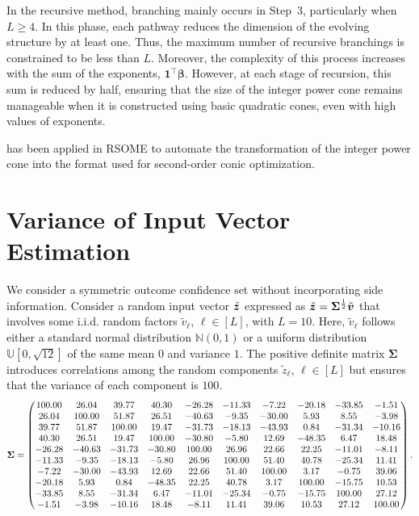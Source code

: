 \documentclass[mnsc, nonblindrev]{informswp}
\newcommand{\1}[1]{\mathds{1}{\left(#1\right)}}
\begin{document}
\begin{appendices}
In the recursive method, branching mainly occurs in Step~$3$, particularly when $L \geq 4$. In this phase, each pathway reduces the dimension of the evolving structure by at least one. Thus, the maximum number of recursive branchings is constrained to be less than \(L\). Moreover, the complexity of this process increases with the sum of the exponents, \(\bm{1}^\top \bm{\beta}\). However, at each stage of recursion, this sum is reduced by half, ensuring that the size of the integer power cone remains manageable when it is constructed using basic quadratic cones, even with high values of exponents.

 has been applied in RSOME to automate the transformation of the integer power cone into the format used for second-order conic optimization.

\section{Variance of Input Vector Estimation}
\label{sec:sensitive_input}
We consider a symmetric outcome confidence set without incorporating side information. Consider a random input vector $\tilde{\bm{z}}$ expressed as $\tilde{\bm{z}} = {\mathbf{\Sigma}}^{\frac{1}{2}} \tilde{\bm{v}}$ that involves some i.i.d. random factors $\tilde v_\ell$, $\ell \in [L]$, with $L = 10$. Here, $\tilde v_\ell$ follows either a standard normal distribution $\mathbb{N}(0,1)$ or a uniform distribution $\mathbb{U}[0,\sqrt{12}]$ of the same mean $0$ and variance $1$. The positive definite matrix $\bm \Sigma$ introduces correlations among the random components $\tilde z_\ell$, $\ell \in [L]$ but ensures that the variance of each component is $100$.
$$
{\mathbf{\Sigma}} = 
\begin{pmatrix}
    100.00 & 26.04  & 39.77  & 40.30  & -26.28 & -11.33 & -7.22  & -20.18 & -33.85 & -1.51  \\
26.04  & 100.00 & 51.87  & 26.51  & -40.63 & -9.35  & -30.00 & 5.93   & 8.55   & -3.98  \\
39.77  & 51.87  & 100.00 & 19.47  & -31.73 & -18.13 & -43.93 & 0.84   & -31.34 & -10.16 \\
40.30  & 26.51  & 19.47  & 100.00 & -30.80 & -5.80  & 12.69  & -48.35 & 6.47   & 18.48  \\
-26.28 & -40.63 & -31.73 & -30.80 & 100.00 & 26.96  & 22.66  & 22.25  & -11.01 & -8.11  \\
-11.33 & -9.35  & -18.13 & -5.80  & 26.96  & 100.00 & 51.40  & 40.78  & -25.34 & 11.41  \\
-7.22  & -30.00 & -43.93 & 12.69  & 22.66  & 51.40  & 100.00 & 3.17   & -0.75  & 39.06  \\
-20.18 & 5.93   & 0.84   & -48.35 & 22.25  & 40.78  & 3.17   & 100.00 & -15.75 & 10.53  \\
-33.85 & 8.55   & -31.34 & 6.47   & -11.01 & -25.34 & -0.75  & -15.75 & 100.00 & 27.12  \\
-1.51  & -3.98  & -10.16 & 18.48  & -8.11  & 11.41  & 39.06  & 10.53  & 27.12  & 100.00 
\end{pmatrix}.
$$


\end{appendices}
\end{document}
